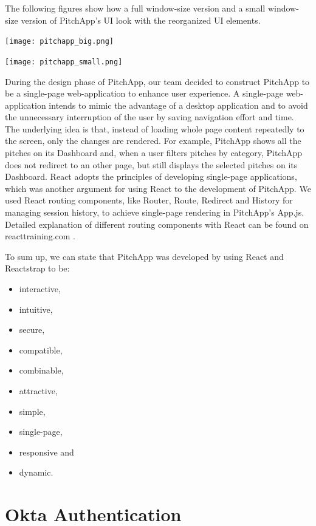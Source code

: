 The following figures show how a full window-size version and a small window-size version of PitchApp's UI look with the reorganized UI elements.

\begin{center}
	\texttt{[image: pitchapp\_big.png]}
\end{center} 

\begin{center}
	\texttt{[image: pitchapp\_small.png]}
\end{center} 

During the design phase of PitchApp, our team decided to construct PitchApp to be a single-page web-application to enhance user experience. A single-page web-application intends to mimic the advantage of a desktop application and to avoid the unnecessary interruption of the user by saving navigation effort and time. The underlying idea is that, instead of loading whole page content repeatedly to the screen, only the changes are rendered. For example, PitchApp shows all the pitches on its Dashboard and, when a user filters pitches by category, PitchApp does not redirect to an other page, but still displays the selected pitches on its Dashboard. React adopts the principles of developing single-page applications, which was another argument for using React to the development of PitchApp. We used React routing components, like Router, Route, Redirect and History for managing session history, to achieve single-page rendering in PitchApp's App.js. Detailed explanation of different routing components with React can be found on reacttraining.com \parencite{React_router}.

To sum up, we can state that PitchApp was developed by using React and Reactstrap to be:

\begin{itemize}
	\item interactive,
	\item intuitive,
	\item secure,
	\item compatible,
	\item combinable,
	\item attractive,
	\item simple,
	\item single-page,
	\item responsive and
	\item dynamic.
\end{itemize}

\section{Okta Authentication}

